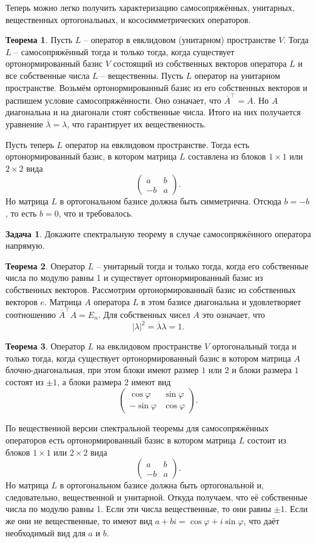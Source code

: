 \documentclass[10pt,a4paper,oneside]{book}
\theoremstyle{definition}
\newtheorem{zad}{Задача}
\newtheorem{thm}{Теорема}
\newcommand{\ovl}{\overline}
\def\ffi{\varphi}
\def\thrm{\begin{thm}}
\def\ethrm{\end{thm}}
\def\zd{\begin{zad}}
\def\ezd{\end{zad}}
\def\pmat{\begin{pmatrix}}
\def\epmat{\end{pmatrix}}
\begin{document}
Теперь можно легко получить характеризацию самосопряжённых, унитарных, вещественных ортогональных, и кососимметрических операторов.

\thrm Пусть $L$ -- оператор в евклидовом (унитарном) пространстве $V$. Тогда $L$ -- самосопряжённый тогда и только тогда, когда существует ортонормированный базис $V$ состоящий из собственных векторов оператора $L$ и все собственные числа $L$ -- вещественны.
\proof Пусть $L$ оператор на унитарном пространстве. Возьмём ортонормированный базис из его собственных векторов и распишем условие самосопряжённости. Оно означает, что $\ovl{A}^{\top}=A$. Но $A$ диагональна и на диагонали стоят собственные числа. Итого на них получается уравнение $\ovl{\lambda}=\lambda$, что гарантирует их вещественность.

Пусть теперь  $L$ оператор на евклидовом пространстве. Тогда есть ортонормированный базис, в котором матрица $L$ составлена из блоков $1\times 1$ или $2\times 2$ вида 
$$\pmat a& b \\ -b & a \epmat.$$
Но матрица $L$ в ортогональном базисе должна быть симметрична. Отсюда $b=-b$, то есть $b=0$, что и требовалось.
\endproof
\ethrm



\zd Докажите спектральную теорему в случае самосопряжённого оператора напрямую.
\ezd

\thrm Оператор $L$ -- унитарный тогда и только тогда, когда его собственные числа по модулю равны 1 и существует ортонормированный базис из собственных векторов. 
\proof Рассмотрим ортонормированный базис из собственных векторов $e$. Матрица $A$ оператора $L$ в этом базисе диагональна и удовлетворяет соотношению $\ovl{A}^{\top}A=E_n$. Для собственных чисел $A$ это означает, что $$|\lambda|^2=\ovl{\lambda}\lambda=1.$$ 
\endproof
\ethrm






\thrm Оператор $L$ на евклидовом пространстве $V$ ортогональный  тогда и только тогда, когда существует ортонормированный базис в котором матрица $A$ блочно-диагональная, при этом блоки имеют размер $1$ или $2$ и блоки размера $1$ состоят из $\pm 1$, а блоки размера 2 имеют вид
$$\begin{pmatrix}
\cos \varphi & \sin \varphi\\

-\sin \varphi &\cos \varphi
\end{pmatrix}.$$
\ethrm
\proof
По вещественной версии спектральной теоремы для самосопряжённых операторов есть ортонормированный базис в котором матрица $L$ состоит из блоков $1\times 1$ или $2\times 2$ вида 
$$\pmat a& b \\ -b & a \epmat.$$
Но матрица $L$ в ортогональном базисе должна быть ортогональной и, следовательно, вещественной и унитарной. Откуда получаем, что её собственные числа по модулю равны 1. Если эти числа вещественные, то они равны $\pm 1$. Если же они не вещественные, то имеют вид $a+bi=\cos \ffi + i \sin \ffi$, что даёт необходимый вид для $a$ и $b$.
\end{document}
